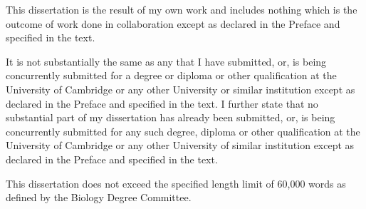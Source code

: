 
\begin{declaration}

This dissertation is the result of my own work and includes nothing which is the outcome of work done in collaboration except as declared in the Preface and specified in the text.

It is not substantially the same as any that I have submitted, or, is being concurrently submitted for a degree or diploma or other qualification at the University of Cambridge or any other University or similar institution except as declared in the Preface and specified in the text.
I further state that no substantial part of my dissertation has already been submitted, or, is being concurrently submitted for any such degree, diploma or other qualification at the University of Cambridge or any other University of similar institution except as declared in the Preface and specified in the text.

This dissertation does not exceed the specified length limit of 60,000 words as defined by the Biology Degree Committee. 


\end{declaration}

